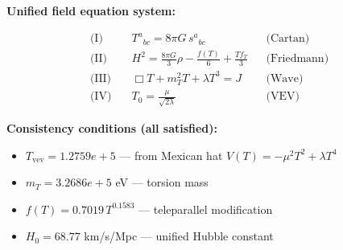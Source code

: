 
\textbf{Unified field equation system:}

\begin{align}
  \text{(I)} \quad & T^a{}_{bc} = 8\pi G \, s^a{}_{bc} && \text{(Cartan)} \\
  \text{(II)} \quad & H^2 = \frac{8\pi G}{3}\rho - \frac{f(T)}{6} + \frac{Tf_T}{3} && \text{(Friedmann)} \\
  \text{(III)} \quad & \Box T + m_T^2 T + \lambda T^3 = J && \text{(Wave)} \\
  \text{(IV)} \quad & T_0 = \frac{\mu}{\sqrt{2\lambda}} && \text{(VEV)}
\end{align}

\textbf{Consistency conditions (all satisfied):}
\begin{itemize}
  \item $T_{\text{vev}} = 1.2759e+5$ — from Mexican hat $V(T) = -\mu^2 T^2 + \lambda T^4$
  \item $m_T = 3.2686e+5$ eV — torsion mass
  \item $f(T) = 0.7019 \, T^{0.1583}$ — teleparallel modification
  \item $H_0 = 68.77$ km/s/Mpc — unified Hubble constant
\end{itemize}
